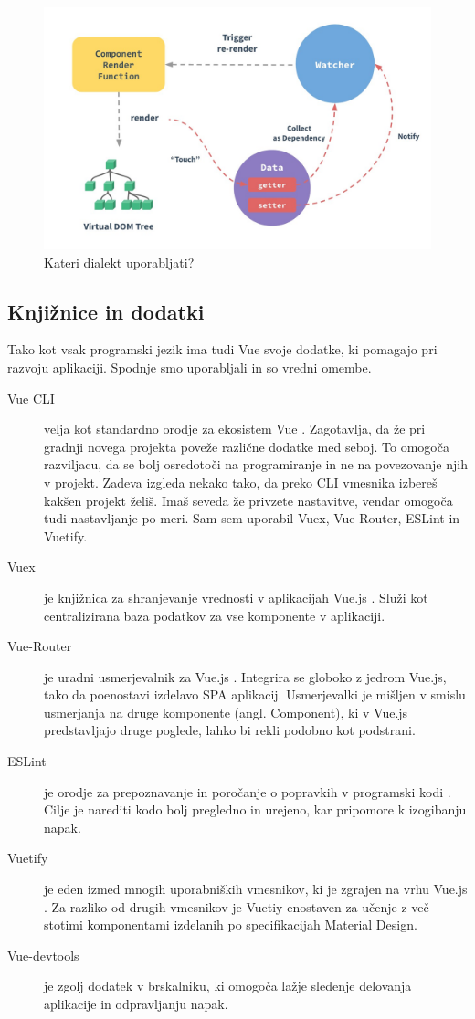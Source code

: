 \documentclass[a4paper, 12pt]{book}
\begin{document}
\begin{figure}[h]
\begin{center}
\includegraphics[width=13cm]{Vue-reactivity.jpg}
\end{center}
\caption{Kateri dialekt uporabljati?}
\label{VueReacitivity}
\end{figure}

\subsection {Knjižnice in dodatki}

Tako kot vsak programski jezik ima tudi Vue svoje dodatke, ki pomagajo pri razvoju aplikaciji. Spodnje smo uporabljali in so vredni omembe.
\begin{description}
\item[Vue CLI] velja kot standardno orodje za ekosistem Vue \cite{VueCLI}. Zagotavlja, da že pri gradnji novega projekta poveže različne dodatke med seboj. To omogoča razviljacu, da se bolj osredotoči na programiranje in ne na povezovanje njih v projekt. Zadeva izgleda nekako tako, da preko CLI vmesnika izbereš kakšen projekt želiš. Imaš seveda že privzete nastavitve, vendar omogoča tudi nastavljanje po meri. Sam sem uporabil Vuex, Vue-Router, ESLint in Vuetify.
\item[Vuex] je knjižnica za shranjevanje vrednosti v aplikacijah Vue.js \cite{Vuex}. Služi kot centralizirana baza podatkov za vse komponente v aplikaciji. 
\item[Vue-Router] je uradni usmerjevalnik za Vue.js \cite{VueRouter}. Integrira se globoko z jedrom Vue.js, tako da poenostavi izdelavo SPA aplikacij. Usmerjevalki je mišljen v smislu usmerjanja na druge komponente (angl. Component), ki v Vue.js predstavljajo druge poglede, lahko bi rekli podobno kot podstrani.
\item[ESLint] je orodje za prepoznavanje in poročanje o popravkih v programski kodi \cite{ESLint}. Cilje je narediti kodo bolj pregledno in urejeno, kar pripomore k izogibanju napak.
\item[Vuetify] je eden izmed mnogih uporabniških vmesnikov, ki je zgrajen na vrhu Vue.js \cite{Vuetify}. Za razliko od drugih vmesnikov je Vuetiy enostaven za učenje z več stotimi komponentami izdelanih po specifikacijah Material Design.
\item[Vue-devtools] je zgolj dodatek v brskalniku, ki omogoča lažje sledenje delovanja aplikacije in odpravljanju napak. 
\end{description}
\end{document}
